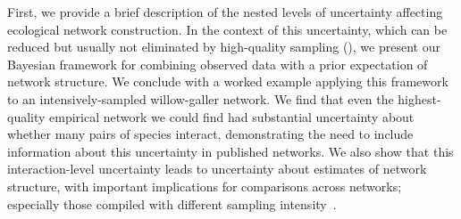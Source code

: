 \documentclass[12pt]{article}
\begin{document}
\begin{spacing}{2.0}
    First, we provide a brief description of the nested levels of uncertainty affecting ecological network construction. In the context of this uncertainty, which can be reduced but usually not eliminated by high-quality sampling (\citealp[see Box 1]{Bartomes2013}), we present our Bayesian framework for combining observed data with a prior expectation of network structure. We conclude with a worked example applying this framework to an intensively-sampled willow-galler network. We find that even the highest-quality empirical network we could find had substantial uncertainty about whether many pairs of species interact, demonstrating the need to include information about this uncertainty in published networks. We also show that this interaction-level uncertainty leads to uncertainty about estimates of network structure, with important implications for comparisons across networks; especially those compiled with different sampling intensity~\citep{Weinstein2017}.







\end{spacing}
\end{document}
